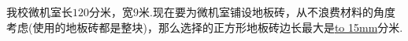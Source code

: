 我校微机室长$120$分米，宽$9$米.现在要为微机室铺设地板砖，从不浪费材料的角度考虑(使用的地板砖都是整块)，那么选择的正方形地板砖边长最大是\underline{\hbox to 15mm{}}分米.



